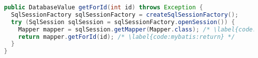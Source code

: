 
\begin{lstlisting}[language=Java, caption={Using MyBatis to load data from database}, label={code:mybatis}]
public DatabaseValue getForId(int id) throws Exception {
  SqlSessionFactory sqlSessionFactory = createSqlSessionFactory();
  try (SqlSession sqlSession = sqlSessionFactory.openSession()) {
    Mapper mapper = sqlSession.getMapper(Mapper.class); /* \label{code:mybatis:getMapper} */
    return mapper.getForId(id); /* \label{code:mybatis:return} */
  }
}
\end{lstlisting}
